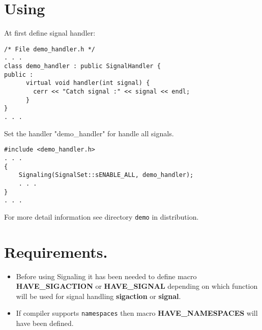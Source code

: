 \documentclass[12pt]{article}
\begin{document}
\section{ Using }
At first define signal handler:
\begin{verbatim}
/* File demo_handler.h */
. . .
class demo_handler : public SignalHandler {
public :
      virtual void handler(int signal) {
        cerr << "Catch signal :" << signal << endl;
      }
}
. . .
\end{verbatim}
Set the handler "demo\_handler" for handle all signals.
\begin{verbatim}
#include <demo_handler.h>
. . .
{
    Signaling(SignalSet::sENABLE_ALL, demo_handler);
    . . .
}
. . .
\end{verbatim}
For more detail information see directory \verb|demo| in distribution.
\section{Requirements.}
\begin{itemize}
  \item Before using Signaling it has been needed to define macro 
     {\bf HAVE\_SIGACTION} or {\bf HAVE\_SIGNAL} depending on which function
     will be used for signal handling {\bf sigaction}  or {\bf signal}.
  \item If compiler supports \verb|namespaces| then macro 
     {\bf HAVE\_NAMESPACES} will have been defined.
\end{itemize}
\end{document}
